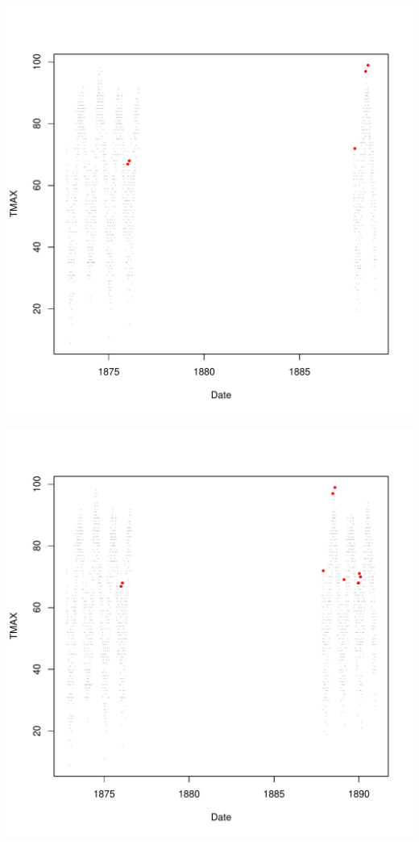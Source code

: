 \documentclass{article}\usepackage[]{graphicx}\usepackage[]{color}
\makeatletter
\def\maxwidth{ %
  \ifdim\Gin@nat@width>\linewidth
    \linewidth
  \else
    \Gin@nat@width
  \fi
}
\newenvironment{knitrout}{}{} %
\makeatother
\begin{document}
\begin{knitrout}
\includegraphics[width=\maxwidth]{figure/unnamed-chunk-4-4} 

\includegraphics[width=\maxwidth]{figure/unnamed-chunk-4-5} 


\end{knitrout}
\end{document}
